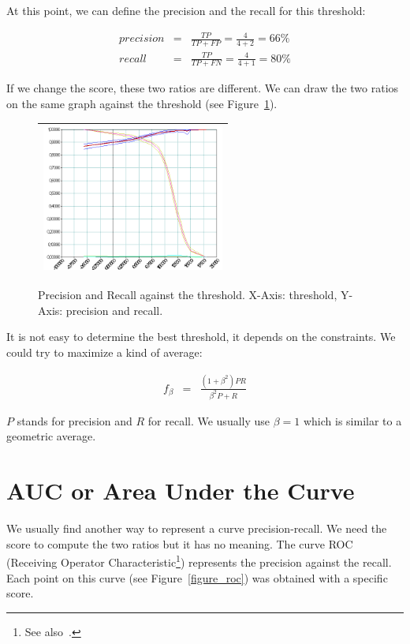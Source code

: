 At this point, we can define the precision and the recall for this threshold:

\begin{eqnarray}
precision &=& \frac{ TP } { TP + FP } = \frac{4}{4+2} = 66\%\\
recall &=& \frac{ TP } { TP + FN } = \frac{4}{4+1} = 80\%
\end{eqnarray}

If we change the score, these two ratios are different. We can draw the two ratios on the same graph against the threshold (see Figure~\ref{figure_precision_recall_threshold}).

\begin{figure}[ht]
\begin{center}\begin{tabular}{|c|} \hline
\includegraphics[width=6cm]{image/prerecall.png} \\ \hline
\end{tabular}\end{center}
\caption{Precision and Recall against the threshold. X-Axis: threshold, Y-Axis: precision and recall.}
\label{figure_precision_recall_threshold}
\end{figure}


It is not easy to determine the best threshold, it depends on the constraints. We could try to maximize a kind of average:

\begin{eqnarray}
f_{\beta} &=& \frac{ (1+\beta^2) P R} { \beta^2 P + R}
\end{eqnarray}

$P$ stands for precision and $R$ for recall. We usually use $\beta=1$ which is similar to a geometric average.

\section{AUC or Area Under the Curve}

We usually find another way to represent a curve precision-recall. We need the score to compute the two ratios but it has no meaning. The curve ROC (Receiving Operator Characteristic\footnote{See also~.}) represents the precision against the recall. Each point on this curve (see Figure~\ref{figure_roc}) was obtained with a specific score.


